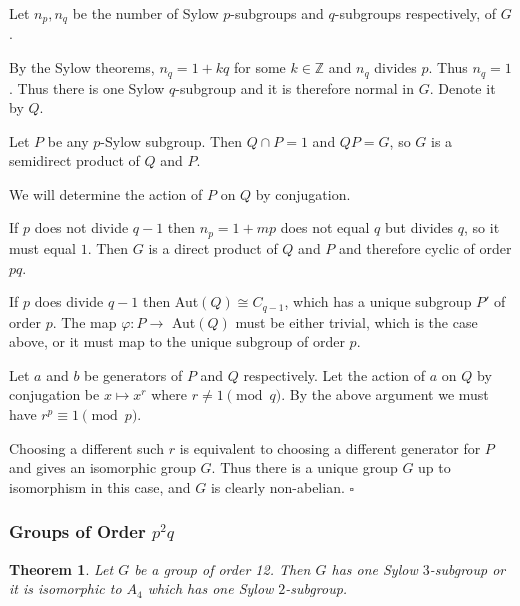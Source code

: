 \documentclass[10pt]{article}
\newcommand{\Z}{\mathbb{Z}}
\newtheorem{theorem}{Theorem}[section]
\newenvironment{proof}[1][Proof]{\begin{trivlist}
\item[\hskip \labelsep {\itshape #1}]}{\end{trivlist}}
\begin{document}
\begin{proof}
Let $n_p, n_q$ be the number of Sylow $p$-subgroups and $q$-subgroups respectively, of $G$.

By the Sylow theorems, $n_q = 1 + kq$ for some $k \in \Z$ and $n_q$ divides $p$. Thus $n_q = 1$. Thus there is one Sylow $q$-subgroup and it is therefore normal in $G$. Denote it by $Q$.

Let $P$ be any $p$-Sylow subgroup. Then $Q\cap P = 1$ and $QP = G$, so $G$ is a semidirect product of $Q$ and $P$.

We will determine the action of $P$ on $Q$ by conjugation.

If $p$ does not divide $q - 1$ then $n_p = 1 + mp$ does not equal $q$ but divides $q$, so it must equal $1$. Then $G$ is a direct product of $Q$ and $P$ and therefore cyclic of order $pq$.

If $p$ does divide $q - 1$ then Aut$(Q) \cong C_{q-1}$, which has a unique subgroup $P'$ of order $p$. The map $\varphi : P \to$ Aut$(Q)$ must be either trivial, which is the case above, or it must map to the unique subgroup of order $p$.

Let $a$ and $b$ be generators of $P$ and $Q$ respectively. Let the action of $a$ on $Q$ by conjugation be $x \mapsto x^r$ where $r \neq 1 \pmod{q}$. By the above argument we must have $r^p \equiv 1 \pmod{p}$.

Choosing a different such $r$ is equivalent to choosing a different generator for $P$ and gives an isomorphic group $G$. Thus there is a unique group $G$ up to isomorphism in this case, and $G$ is clearly non-abelian. $\square$
\end{proof}

\subsubsection{Groups of Order $p^2q$}

\begin{theorem}
Let $G$ be a group of order 12. Then $G$ has one Sylow $3$-subgroup or it is isomorphic to $A_4$ which has one Sylow $2$-subgroup.
\end{theorem}
\end{document}
